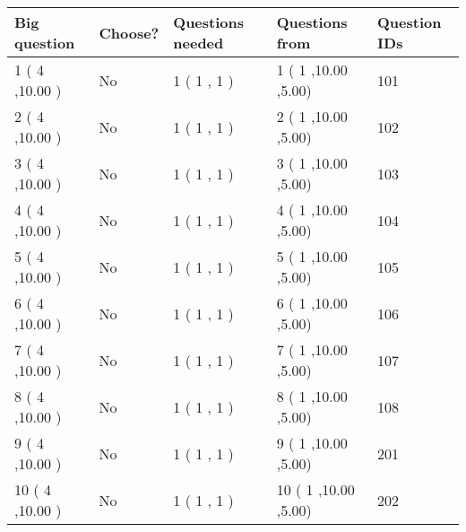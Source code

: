 \documentclass{ctexart}
\begin{document}
   
\noindent\hspace{-0.4in}\begin{tabular}{|l|l|l|l|l|}
\hline
 Big question & Choose? & Questions needed & Questions from & Question IDs \\ 
\hline
 1 ( 4 ,10.00
 ) &  No   & 
 1 ( 1 ,  1 ) &  1 ( 1
,10.00
 ,5.00) &  101  \\
 \hline
 2 ( 4 ,10.00
 ) &  No   & 
 1 ( 1 ,  1 ) &  2 ( 1
,10.00
 ,5.00) &  102  \\
 \hline
 3 ( 4 ,10.00
 ) &  No   & 
 1 ( 1 ,  1 ) &  3 ( 1
,10.00
 ,5.00) &  103  \\
 \hline
 4 ( 4 ,10.00
 ) &  No   & 
 1 ( 1 ,  1 ) &  4 ( 1
,10.00
 ,5.00) &  104  \\
 \hline
 5 ( 4 ,10.00
 ) &  No   & 
 1 ( 1 ,  1 ) &  5 ( 1
,10.00
 ,5.00) &  105  \\
 \hline
 6 ( 4 ,10.00
 ) &  No   & 
 1 ( 1 ,  1 ) &  6 ( 1
,10.00
 ,5.00) &  106  \\
 \hline
 7 ( 4 ,10.00
 ) &  No   & 
 1 ( 1 ,  1 ) &  7 ( 1
,10.00
 ,5.00) &  107  \\
 \hline
 8 ( 4 ,10.00
 ) &  No   & 
 1 ( 1 ,  1 ) &  8 ( 1
,10.00
 ,5.00) &  108  \\
 \hline
 9 ( 4 ,10.00
 ) &  No   & 
 1 ( 1 ,  1 ) &  9 ( 1
,10.00
 ,5.00) &  201  \\
 \hline
 10 ( 4 ,10.00
 ) &  No   & 
 1 ( 1 ,  1 ) &  10 ( 1
,10.00
 ,5.00) &  202  \\
 \hline
 \end{tabular}
 
 
\end{document}
